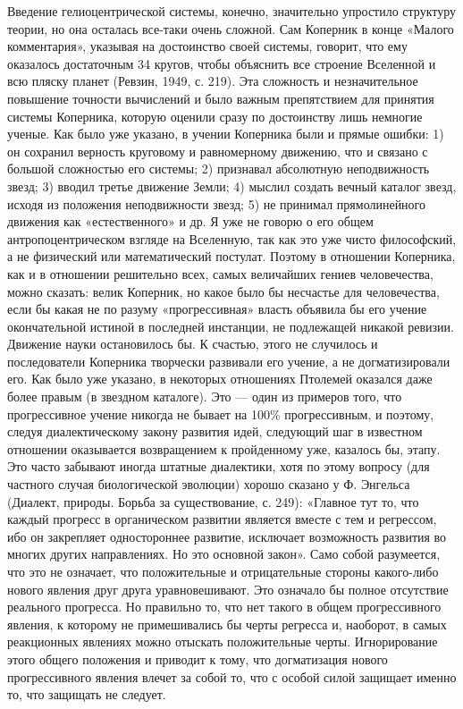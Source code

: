 Введение гелиоцентрической системы, конечно, значительно упростило
структуру теории, но она осталась все-таки очень сложной. Сам Коперник
в конце «Малого комментария», указывая на достоинство своей системы,
говорит, что ему оказалось достаточным 34 кругов, чтобы объяснить все
строение Вселенной и всю пляску планет (Ревзин, 1949, с. 219). Эта
сложность и незначительное повышение точности вычислений и было важным
препятствием для принятия системы Коперника, которую оценили сразу по
достоинству лишь немногие ученые. Как было уже указано, в учении
Коперника были и прямые ошибки: 1) он сохранил верность круговому и
равномерному движению, что и связано с большой сложностью его системы;
2) признавал абсолютную неподвижность звезд; 3) вводил третье движение
Земли; 4) мыслил создать вечный каталог звезд, исходя из положения
неподвижности звезд; 5) не принимал прямолинейного движения как
«естественного» и др. Я уже не говорю о его общем антропоцентрическом
взгляде на Вселенную, так как это уже чисто философский, а не
физический или математический постулат. Поэтому в отношении Коперника,
как и в отношении решительно всех, самых величайших гениев
человечества, можно сказать: велик Коперник, но какое было бы
несчастье для человечества, если бы какая не по разуму «прогрессивная»
власть объявила бы его учение окончательной истиной в последней
инстанции, не подлежащей никакой ревизии. Движение науки остановилось
бы. К счастью, этого не случилось и последователи Коперника творчески
развивали его учение, а не догматизировали его. Как было уже указано,
в некоторых отношениях Птолемей оказался даже более правым (в звездном
каталоге). Это --- один из примеров того, что прогрессивное учение
никогда не бывает на 100\% прогрессивным, и поэтому, следуя
диалектическому закону развития идей, следующий шаг в известном
отношении оказывается возвращением к пройденному уже, казалось бы,
этапу. Это часто забывают иногда штатные диалектики, хотя по этому
вопросу (для частного случая биологической эволюции) хорошо сказано у
Ф. Энгельса (Диалект, природы. Борьба за существование, с. 249):
«Главное тут то, что каждый прогресс в органическом развитии является
вместе с тем и регрессом, ибо он закрепляет одностороннее развитие,
исключает возможность развития во многих других направлениях. Но это
основной закон». Само собой разумеется, что это не означает, что
положительные и отрицательные стороны какого-либо нового явления друг
друга уравновешивают. Это означало бы полное отсутствие реального
прогресса. Но правильно то, что нет такого в общем прогрессивного
явления, к которому не примешивались бы черты регресса и, наоборот, в
самых реакционных явлениях можно отыскать положительные черты.
Игнорирование этого общего положения и приводит к тому, что
догматизация нового прогрессивного явления влечет за собой то, что с
особой силой защищает именно то, что защищать не следует.

